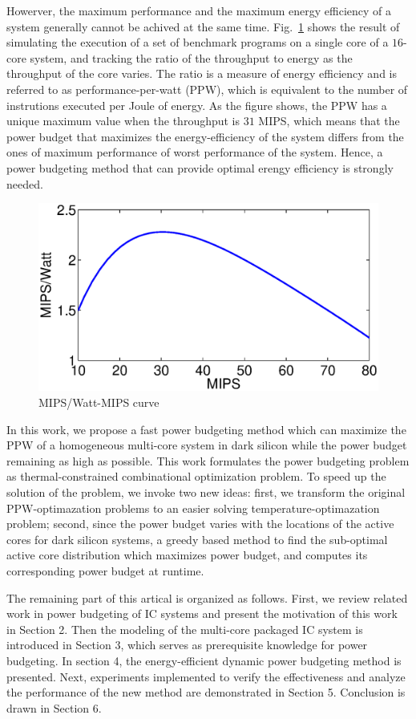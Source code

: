 Howerver, the maximum performance and the maximum energy efficiency of a system generally cannot be achived at the same time. Fig.~\ref{fig:ppw_mips} shows the result of simulating the execution of a set of benchmark programs on a single core of a $16$-core system, and tracking the ratio of the throughput to energy as the throughput of the core varies. The ratio is a measure of energy efficiency and is referred to as performance-per-watt (PPW), which is equivalent to the number of instrutions executed per Joule of energy. As the figure shows, the PPW has a unique maximum value when the throughput is $31$ MIPS, which means that the power budget that maximizes the energy-efficiency of the system differs from the ones of maximum performance of worst performance of the system. Hence, a power budgeting method that can provide optimal erengy efficiency is strongly needed.



\begin{figure}
\centering
\includegraphics[width=1\linewidth]{fig/ppw_mips.eps}
\caption{MIPS/Watt-MIPS curve}
\label{fig:ppw_mips}
\end{figure}

In this work, we propose a fast power budgeting method which can maximize the PPW of a homogeneous multi-core system in dark silicon while the power budget remaining as high as possible. This work formulates the power budgeting problem as thermal-constrained combinational optimization problem. To speed up the solution of the problem, we invoke two new ideas: first, we transform the original PPW-optimazation problems to an easier solving temperature-optimazation problem; second, since the power budget varies with the locations of the active cores for dark silicon systems, a greedy based method to find the sub-optimal active core distribution which maximizes power budget, and computes its corresponding power budget at runtime.

The remaining part of this artical is organized as follows. First, we review related work in power budgeting of IC systems and present the motivation of this work in Section 2. Then the modeling of the multi-core packaged IC system is introduced in Section 3, which serves as prerequisite knowledge for power budgeting. In section 4, the energy-efficient dynamic power budgeting method is presented. Next, experiments implemented to verify the effectiveness and analyze the performance of the new method are demonstrated in Section 5. Conclusion is drawn in Section 6.
